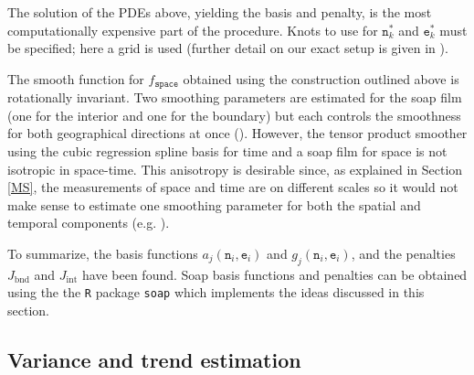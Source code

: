 The solution of the PDEs above, yielding the basis and penalty, is the most computationally expensive part of the procedure. Knots to use for $\texttt{n}_k^*$ and $\texttt{e}_k^*$ must be specified; here a grid is used (further detail on our exact setup is given in ).

The smooth function for $f_\texttt{space}$ obtained using the construction outlined above is rotationally invariant. Two smoothing parameters are estimated for the soap film (one for the interior and one for the boundary) but each controls the smoothness for both geographical directions at once (\cite{soap}). However, the tensor product smoother using the cubic regression spline basis for time and a soap film for space is not isotropic in space-time. This anisotropy is desirable since, as explained in Section \ref{MS}, the measurements of space and time are on different scales so it would not make sense to estimate one smoothing parameter for both the spatial and temporal components (e.g. \cite[p. 162]{simonbook}).
 
To summarize, the basis functions $a_j(\texttt{n}_i,\texttt{e}_i)$ and $g_j(\texttt{n}_i,\texttt{e}_i)$, and the penalties $J_\text{bnd}$ and $J_\text{int}$ have been found. Soap basis functions and penalties can be obtained using the the \texttt{R} package \texttt{soap} which implements the ideas discussed in this section.

\subsection{Variance and trend estimation \label{VE}}

